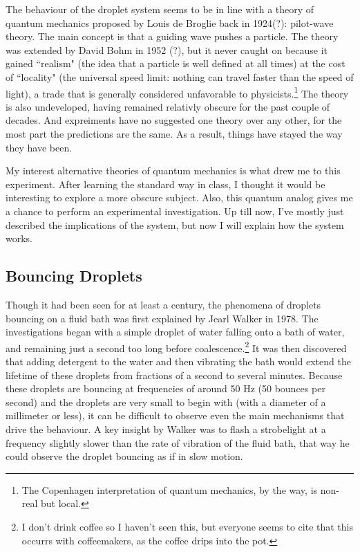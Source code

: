     The behaviour of the droplet system seems to be in line with a theory of quantum mechanics proposed by Louis de Broglie back in 1924(?): pilot-wave theory. The main concept is that a guiding wave pushes a particle. The theory was extended by David Bohm in 1952 (?), but it never caught on because it gained ``realism" (the idea that a particle is well defined at all times) at the cost of ``locality" (the universal speed limit: nothing can travel faster than the speed of light), a trade that is generally considered unfavorable to physicists.\footnote{The Copenhagen interpretation of quantum mechanics, by the way, is non-real but local.} The theory is also undeveloped, having remained relativly obscure for the past couple of decades. And expreiments have no suggested one theory over any other, for the most part the predictions are the same. As a result, things have stayed the way they have been. 
    
    My interest alternative theories of quantum mechanics is what drew me to this experiment. After learning the standard way in class, I thought it would be interesting to explore a more obscure subject. Also, this quantum analog gives me a chance to perform an experimental investigation. Up till now, I've mostly just described the implications of the system, but now I will explain how the system works. 

	    \subsection{Bouncing Droplets}
	    Though it had been seen for at least a century, the phenomena of droplets bouncing on a fluid bath was first explained by Jearl Walker in 1978. The investigations began with a simple droplet of water falling onto a bath of water, and remaining just a second too long before coalescence.\footnote{I don't drink coffee so I haven't seen this, but everyone seems to cite that this occurrs with coffeemakers, as the coffee drips into the pot.} It was then discovered that adding detergent to the water and then vibrating the bath would extend the lifetime of these droplets from fractions of a second to several minutes. Because these droplets are bouncing at frequencies of around 50 Hz (50 bounces per second) and the droplets are very small to begin with (with a diameter of a millimeter or less), it can be difficult to observe even the main mechanisms that drive the behaviour. A key insight by Walker was to flash a strobelight at a frequency slightly slower than the rate of vibration of the fluid bath, that way he could observe the droplet bouncing as if in slow motion.
	    
